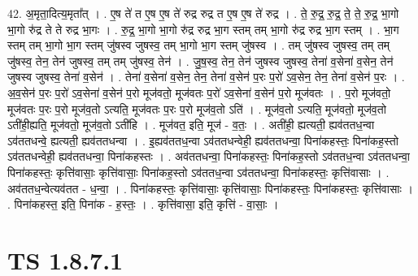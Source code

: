 \documentclass[17pt]{extarticle}
\begin{document}
42. अ॒मृता॒दित्य॒मृता᳚त् । . ए॒ष ते॑ त ए॒ष ए॒ष ते॑ रुद्र रुद्र त ए॒ष ए॒ष ते॑ रुद्र । . ते॒ रु॒द्र॒ रु॒द्र॒ ते॒ ते॒ रु॒द्र॒ भा॒गो भा॒गो रु॑द्र ते ते रुद्र भा॒गः । . रु॒द्र॒ भा॒गो भा॒गो रु॑द्र रुद्र भा॒ग स्तम् तम् भा॒गो रु॑द्र रुद्र भा॒ग स्तम् । . भा॒ग स्तम् तम् भा॒गो भा॒ग स्तम् जु॑षस्व जुषस्व॒ तम् भा॒गो भा॒ग स्तम् जु॑षस्व । . तम् जु॑षस्व जुषस्व॒ तम् तम् जु॑षस्व॒ तेन॒ तेन॑ जुषस्व॒ तम् तम् जु॑षस्व॒ तेन॑ । . जु॒ष॒स्व॒ तेन॒ तेन॑ जुषस्व जुषस्व॒ तेना॑ व॒सेना॑ व॒सेन॒ तेन॑ जुषस्व जुषस्व॒ तेना॑ व॒सेन॑ । . तेना॑ व॒सेना॑ व॒सेन॒ तेन॒ तेना॑ व॒सेन॑ प॒रः प॒रो॑ ऽव॒सेन॒ तेन॒ तेना॑ व॒सेन॑ प॒रः । . अ॒व॒सेन॑ प॒रः प॒रो॑ ऽव॒सेना॑ व॒सेन॑ प॒रो मूज॑वतो॒ मूज॑वतः प॒रो॑ ऽव॒सेना॑ व॒सेन॑ प॒रो मूज॑वतः । . प॒रो मूज॑वतो॒ मूज॑वतः प॒रः प॒रो मूज॑व॒तो ऽत्यति॒ मूज॑वतः प॒रः प॒रो मूज॑व॒तो ऽति॑ । . मूज॑व॒तो ऽत्यति॒ मूज॑वतो॒ मूज॑व॒तो ऽती॑ही॒ह्यति॒ मूज॑वतो॒ मूज॑व॒तो ऽती॑हि । . मूज॑वत॒ इति॒ मूज॑ - व॒तः॒ । . अती॑ही॒ ह्यत्यती॒ ह्यव॑ततध॒न्वा ऽव॑ततधन्वे॒ ह्यत्यती॒ ह्यव॑ततधन्वा । . इ॒ह्यव॑ततध॒न्वा ऽव॑ततधन्वेही॒ ह्यव॑ततधन्वा॒ पिना॑कहस्तः॒ पिना॑कह॒स्तो ऽव॑ततधन्वेही॒ ह्यव॑ततधन्वा॒ पिना॑कहस्तः । . अव॑ततधन्वा॒ पिना॑कहस्तः॒ पिना॑कह॒स्तो ऽव॑ततध॒न्वा ऽव॑ततधन्वा॒ पिना॑कहस्तः॒ कृत्ति॑वासाः॒ कृत्ति॑वासाः॒ पिना॑कह॒स्तो ऽव॑ततध॒न्वा ऽव॑ततधन्वा॒ पिना॑कहस्तः॒ कृत्ति॑वासाः । . अव॑ततध॒न्वेत्यव॑तत - ध॒न्वा॒ । . पिना॑कहस्तः॒ कृत्ति॑वासाः॒ कृत्ति॑वासाः॒ पिना॑कहस्तः॒ पिना॑कहस्तः॒ कृत्ति॑वासाः । . पिना॑कहस्त॒ इति॒ पिना॑क - ह॒स्तः॒ । . कृत्ति॑वासा॒ इति॒ कृत्ति॑ - वा॒साः॒ । \newline
\pagebreak
{}

\section{ TS 1.8.7.1 }
\end{document}
